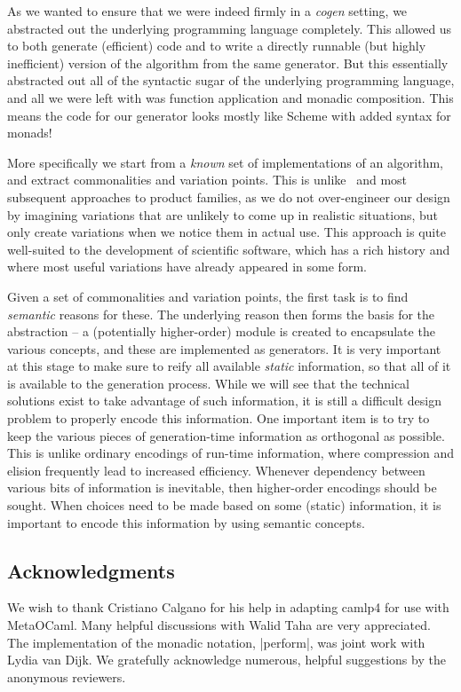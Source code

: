 \documentclass{elsart}
\begin{document}
As we wanted to ensure that we were indeed firmly in a \emph{cogen} setting,
we abstracted out the underlying programming language completely.  This 
allowed us to both generate (efficient) code and to write a directly
runnable (but highly inefficient) version of the algorithm from the same
generator.  But this
essentially abstracted out all of the syntactic sugar of the underlying
programming language, and all we were left with was function application
and monadic composition.  This means the code for our generator looks mostly
like Scheme with added syntax for monads!

More specifically we start from a \emph{known} set of implementations
of an algorithm, and extract commonalities and variation points.
This is unlike~\cite{journals/tse/Parnas76} and most subsequent
approaches to product families, as we do not over-engineer our design
by imagining variations that are unlikely to come up in realistic
situations, but only create variations when we notice them in actual use.
This approach is quite well-suited to the development of scientific
software, which has a rich history and where most useful variations have
already appeared in some form.

Given a set of commonalities and variation points, the first task is to
find \emph{semantic} reasons for these.  The underlying reason then
forms the basis for the abstraction -- a (potentially higher-order)
module is created to encapsulate the various concepts, and these are
implemented as generators.  It is very important at this stage to
make sure to reify all available \emph{static} information, so that all
of it is available to the generation process.  While we will see that
the technical solutions exist to take advantage of such information,
it is still a difficult design problem to properly encode this information.
One important item is to try to keep the various pieces of generation-time
information as orthogonal as possible.  This is unlike ordinary encodings
of run-time information, where compression and elision frequently lead
to increased efficiency.  Whenever dependency between various bits of
information is
inevitable, then higher-order encodings should be sought.  When choices
need to be made based on some (static) information, it is important to
encode this information by using semantic concepts.

\subsection*{Acknowledgments}
We wish to thank Cristiano Calgano for his help in adapting camlp4 for
use with MetaOCaml. Many helpful discussions with Walid Taha are very
appreciated. The implementation of the monadic notation, |perform|,
was joint work with Lydia van Dijk.  We gratefully acknowledge
numerous, helpful suggestions by the anonymous reviewers.
\end{document}
